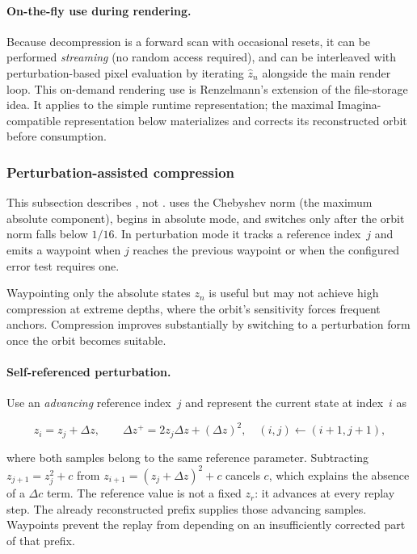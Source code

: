 \paragraph{On-the-fly use during rendering.}
Because decompression is a forward scan with occasional resets, it can be
performed \emph{streaming} (no random access required), and can be interleaved
with perturbation-based pixel evaluation by iterating \(\hat z_n\) alongside the
main render loop. This on-demand rendering use is Renzelmann's extension of
the file-storage idea. It applies to the simple runtime representation; the
maximal Imagina-compatible representation below materializes and corrects its
reconstructed orbit before consumption.

\subsubsection{Perturbation-assisted compression}

\label{sec:refcomp-pert}
This subsection describes , not
.   uses the Chebyshev norm (the
maximum absolute component), begins in absolute mode, and switches only after
the orbit norm falls below $1/16$.  In perturbation mode it tracks a reference
index~$j$ and emits a waypoint when $j$ reaches the previous waypoint or when
the configured error test requires one.

Waypointing only the absolute states \(z_n\) is useful but may not achieve high
compression at extreme depths, where the orbit's sensitivity forces frequent
anchors.  Compression improves substantially by switching to a perturbation form
once the orbit becomes suitable.

\paragraph{Self-referenced perturbation.}
Use an \emph{advancing} reference index~$j$ and represent the current state
at index~$i$ as

\begin{equation}
  z_i = z_j + \Delta z,\qquad
  \Delta z^{+}=2z_j\Delta z+(\Delta z)^2,
  \quad (i,j)\leftarrow(i+1,j+1),
  \label{eq:self-ref-perturbation}
\end{equation}

where both samples belong to the same reference parameter.  Subtracting
$z_{j+1}=z_j^2+c$ from $z_{i+1}=(z_j+\Delta z)^2+c$ cancels $c$,
which explains the absence of a $\Delta c$ term.  The reference value is
not a fixed $z_r$: it advances at every replay step.  The already
reconstructed prefix supplies those advancing samples.  Waypoints prevent
the replay from depending on an insufficiently corrected part of that prefix.

